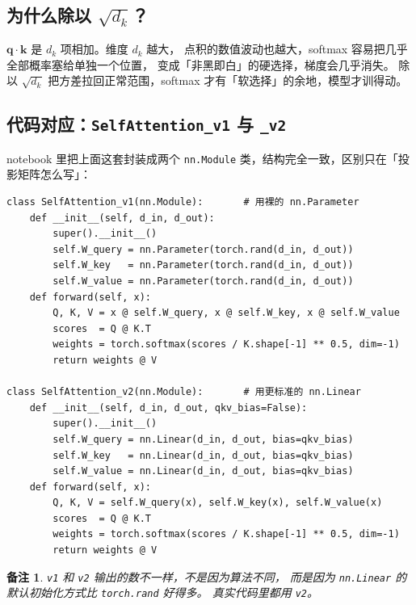 \documentclass[11pt,a4paper]{ctexart}
\newtheorem{remark}[theorem]{备注}
\newcommand{\vect}[1]{\boldsymbol{#1}}
\begin{document}
\subsection*{为什么除以 $\sqrt{d_k}$？}

\begin{intuitionblock}
$\vect{q}\cdot\vect{k}$ 是 $d_k$ 项相加。维度 $d_k$ 越大，
点积的数值波动也越大，softmax 容易把几乎全部概率塞给单独一个位置，
变成「非黑即白」的硬选择，梯度会几乎消失。
除以 $\sqrt{d_k}$ 把方差拉回正常范围，softmax 才有「软选择」的余地，模型才训得动。
\end{intuitionblock}

\subsection{代码对应：\texttt{SelfAttention\_v1} 与 \texttt{\_v2}}

notebook 里把上面这套封装成两个 \texttt{nn.Module} 类，结构完全一致，区别只在「投影矩阵怎么写」：

\begin{codebox}
\begin{lstlisting}
class SelfAttention_v1(nn.Module):       # 用裸的 nn.Parameter
    def __init__(self, d_in, d_out):
        super().__init__()
        self.W_query = nn.Parameter(torch.rand(d_in, d_out))
        self.W_key   = nn.Parameter(torch.rand(d_in, d_out))
        self.W_value = nn.Parameter(torch.rand(d_in, d_out))
    def forward(self, x):
        Q, K, V = x @ self.W_query, x @ self.W_key, x @ self.W_value
        scores  = Q @ K.T
        weights = torch.softmax(scores / K.shape[-1] ** 0.5, dim=-1)
        return weights @ V

class SelfAttention_v2(nn.Module):       # 用更标准的 nn.Linear
    def __init__(self, d_in, d_out, qkv_bias=False):
        super().__init__()
        self.W_query = nn.Linear(d_in, d_out, bias=qkv_bias)
        self.W_key   = nn.Linear(d_in, d_out, bias=qkv_bias)
        self.W_value = nn.Linear(d_in, d_out, bias=qkv_bias)
    def forward(self, x):
        Q, K, V = self.W_query(x), self.W_key(x), self.W_value(x)
        scores  = Q @ K.T
        weights = torch.softmax(scores / K.shape[-1] ** 0.5, dim=-1)
        return weights @ V
\end{lstlisting}
\end{codebox}

\begin{remark}
\texttt{v1} 和 \texttt{v2} 输出的数不一样，\emph{不是}因为算法不同，
而是因为 \texttt{nn.Linear} 的默认初始化方式比 \texttt{torch.rand} 好得多。
真实代码里都用 \texttt{v2}。
\end{remark}
\end{document}
